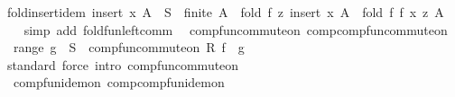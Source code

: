 \begin{isabellebody}
\isanewline
{}\isamarkupfalse%
\ fold{\isacharunderscore}{\kern0pt}insert{\isacharunderscore}{\kern0pt}idem{}{\isacharcolon}{\kern0pt}\ {\isachardoublequoteopen}insert\ x\ A\ {\isasymsubseteq}\ S\ {\isasymLongrightarrow}\ finite\ A\ {\isasymLongrightarrow}\ fold\ f\ z\ {\isacharparenleft}{\kern0pt}insert\ x\ A{\isacharparenright}{\kern0pt}\ {\isacharequal}{\kern0pt}\ fold\ f\ {\isacharparenleft}{\kern0pt}f\ x\ z{\isacharparenright}{\kern0pt}\ A{\isachardoublequoteclose}\isanewline
%
\isadelimproof
\ \ %
\endisadelimproof
%
\isatagproof
{}\isamarkupfalse%
\ {\isacharparenleft}{\kern0pt}simp\ add{\isacharcolon}{\kern0pt}\ fold{\isacharunderscore}{\kern0pt}fun{\isacharunderscore}{\kern0pt}left{\isacharunderscore}{\kern0pt}comm{\isacharparenright}{\kern0pt}%
\endisatagproof
{\isafoldproof}%
%
\isadelimproof
\isanewline
%
\endisadelimproof
\isanewline
{}\isamarkupfalse%
%
\isadelimdocument
%
\endisadelimdocument
%
\isatagdocument
%
\isamarkuptrue%
%
\endisatagdocument
{\isafolddocument}%
%
\isadelimdocument
%
\endisadelimdocument
{}\isamarkupfalse%
\ {\isacharparenleft}{\kern0pt}\ comp{\isacharunderscore}{\kern0pt}fun{\isacharunderscore}{\kern0pt}commute{\isacharunderscore}{\kern0pt}on{\isacharparenright}{\kern0pt}\ comp{\isacharunderscore}{\kern0pt}comp{\isacharunderscore}{\kern0pt}fun{\isacharunderscore}{\kern0pt}commute{\isacharunderscore}{\kern0pt}on{\isacharcolon}{\kern0pt}\isanewline
\ \ {\isachardoublequoteopen}range\ g\ {\isasymsubseteq}\ S\ {\isasymLongrightarrow}\ comp{\isacharunderscore}{\kern0pt}fun{\isacharunderscore}{\kern0pt}commute{\isacharunderscore}{\kern0pt}on\ R\ {\isacharparenleft}{\kern0pt}f\ {\isasymcirc}\ g{\isacharparenright}{\kern0pt}{\isachardoublequoteclose}\isanewline
%
\isadelimproof
\ \ %
\endisadelimproof
%
\isatagproof
{}\isamarkupfalse%
\ standard\ {\isacharparenleft}{\kern0pt}force\ intro{\isacharcolon}{\kern0pt}\ comp{\isacharunderscore}{\kern0pt}fun{\isacharunderscore}{\kern0pt}commute{\isacharunderscore}{\kern0pt}on{\isacharparenright}{\kern0pt}%
\endisatagproof
{\isafoldproof}%
%
\isadelimproof
\isanewline
%
\endisadelimproof
\isanewline
{}\isamarkupfalse%
\ {\isacharparenleft}{\kern0pt}\ comp{\isacharunderscore}{\kern0pt}fun{\isacharunderscore}{\kern0pt}idem{\isacharunderscore}{\kern0pt}on{\isacharparenright}{\kern0pt}\ comp{\isacharunderscore}{\kern0pt}comp{\isacharunderscore}{\kern0pt}fun{\isacharunderscore}{\kern0pt}idem{\isacharunderscore}{\kern0pt}on{\isacharcolon}{\kern0pt}\isanewline

\end{isabellebody}
